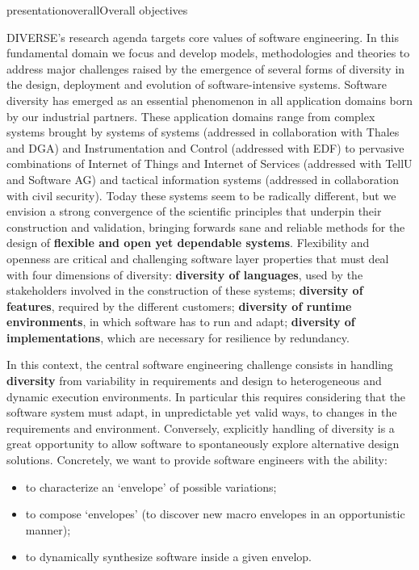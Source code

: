\documentclass{ra2018}
\newcommand{\team}{DIVERSE}
\begin{document}
\begin{module}{presentation}{overall}{Overall objectives}

  \team{}'s research agenda targets core values of software engineering. 
  In this fundamental domain we focus and develop models, methodologies and theories to address major challenges raised by the emergence of several forms of diversity in the design, deployment and evolution of software-intensive systems.
  Software diversity has emerged as an essential phenomenon in all application domains born by our industrial partners. These application domains range from complex systems brought by systems of systems (addressed in collaboration with Thales and DGA) and Instrumentation and Control (addressed with EDF) to pervasive combinations of Internet of Things and Internet of Services (addressed with TellU and Software AG) and tactical information systems (addressed in collaboration with civil  security).
  Today these systems seem to be radically different, but we envision a strong convergence  of the scientific principles that underpin their construction and validation, bringing forwards sane and reliable methods for the design of  \textbf{flexible and open yet dependable systems}. 
  Flexibility and openness are critical and challenging software layer properties that must deal with four dimensions of diversity: \textbf{diversity of languages}, used by the stakeholders involved in the construction of these systems;  \textbf{diversity of features}, required by the different customers; \textbf{diversity of runtime environments}, in which software has to run and adapt; \textbf{diversity of implementations}, which are necessary for resilience by redundancy.

  In this context, the central software engineering challenge consists in handling \textbf{diversity} from variability in requirements and design to heterogeneous and dynamic execution environments. 
  In particular this requires considering that the software system must adapt, in unpredictable yet valid ways, to changes in the requirements and environment. 
  Conversely, explicitly handling of diversity is a great opportunity to allow software to spontaneously explore alternative design solutions. 
  Concretely, we want to provide software engineers with the ability:
  \begin{itemize}
      \item to characterize an `envelope' of possible variations;
      \item to compose `envelopes' (to discover new macro envelopes in an opportunistic manner);
      \item to dynamically synthesize software inside a given  envelop.
  \end{itemize}


\end{module}
\end{document}
